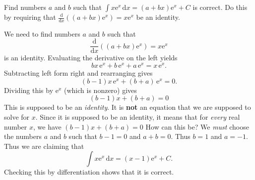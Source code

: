 \documentclass[12pt,fleqn,answers]{exam}
\begin{document}
\begin{questions}
\question [1] Find numbers $a$ and $b$ such that
$
 \int x  \mathrm{e}^x \, \mathrm{d} x = (a + b x) \mathrm{e}^x + C
$
is correct. Do this by requiring that
$
\frac{\mathrm{d}}{\mathrm{d} x} \left((a + b x) \mathrm{e}^x \right)
   = x  \mathrm{e}^x
$ be an identity.
\begin{solution}
We need to find numbers $a$ and $b$ such that 
\begin{equation*}
  \frac{\mathrm{d}}{\mathrm{d} x}
  \left((a + b x) \mathrm{e}^x \right) = x  \mathrm{e}^x
\end{equation*}
is an identity. Evaluating the derivative on the left yields
\begin{equation*}
  b x\, {{\mathrm e}^{x}}+b\, {{\mathrm e}^{x}}+a\, {{\mathrm e}^{x}}=x\, {{\mathrm e}^{x}}.
\end{equation*}
Subtracting left form right and rearranging gives
\begin{equation*}
  \left( b-1\right)  x\, {{\mathrm e}^{x}}+\left( b+a\right) \, {{\mathrm e}^{x}}=0.
\end{equation*}
Dividing this by ${\mathrm e}^{x}$ (which is nonzero) gives
\begin{equation*}
  \left( b-1\right)  x +\left( b+a\right) =0
\end{equation*}
This is supposed to be an \emph{identity}. It is \textbf{not}
an equation that we are supposed to solve for $x$. Since 
it is supposed to be an identity, it means that for
\emph{every} real number $x$, we have $\left( b-1\right)  x +\left( b+a\right) =0$
How can this be? We \emph{must} choose the numbers $a$ and
$b$ such that $b-1= 0$ and $a+b=0$. Thus $b=1$ and $a=-1$.
Thus we are claiming that
$$
 \int x  \mathrm{e}^x \, \mathrm{d} x = (x - 1) \mathrm{e}^x + C.
$$
Checking this by differentiation shows that it is correct.

\end{solution}

\end{questions}
\end{document}
